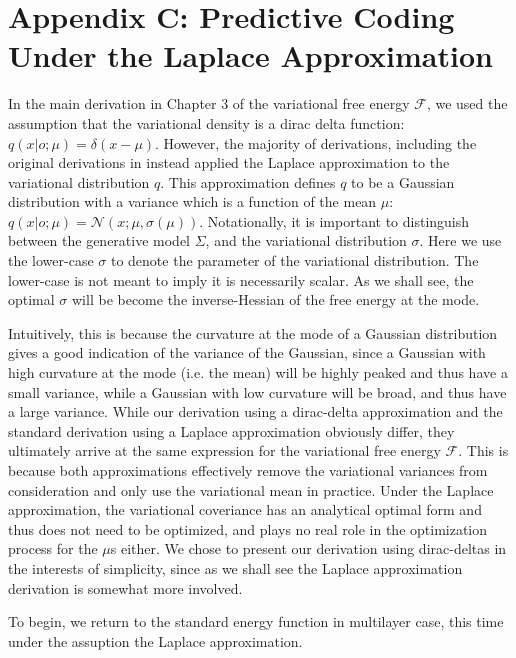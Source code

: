 
\chapter{Appendix C: Predictive Coding Under the Laplace Approximation}

In the main derivation in Chapter 3 of the variational free energy $\mathcal{F}$, we used the assumption that the variational density is a dirac delta function: $q(x | o; \mu) = \delta(x - \mu)$. However, the majority of derivations, including the original derivations in \citep{friston2005theory} instead applied the Laplace approximation to the variational distribution $q$. This approximation defines $q$ to be a Gaussian distribution with a variance which is a function of the mean $\mu$:  $q(x | o; \mu) = \mathcal{N}(x;\mu, \sigma(\mu))$. Notationally, it is important to distinguish between the generative model $\Sigma$, and the variational distribution $\sigma$. Here we use the lower-case $\sigma$ to denote the parameter of the variational distribution. The lower-case is not meant to imply it is necessarily scalar. As we shall see, the optimal $\sigma$ will be become the inverse-Hessian of the free energy at the mode. 

Intuitively, this is because the curvature at the mode of a Gaussian distribution gives a good indication of the variance of the Gaussian, since a Gaussian with high curvature at the mode (i.e. the mean) will be highly peaked and thus have a small variance, while a Gaussian with low curvature will be broad, and thus have a large variance.  While our derivation using a dirac-delta approximation and the standard derivation using a Laplace approximation obviously differ, they ultimately arrive at the same expression for the variational free energy $\mathcal{F}$. This is because both approximations effectively remove the variational variances from consideration and only use the variational mean in practice. Under the Laplace approximation, the variational coveriance has an analytical optimal form and thus does not need to be optimized, and plays no real role in the optimization process for the $\mu$s either. We chose to present our derivation using dirac-deltas in the interests of simplicity, since as we shall see the Laplace approximation derivation is somewhat more involved.

To begin, we return to the standard energy function in multilayer case, this time under the assuption the Laplace approximation.

